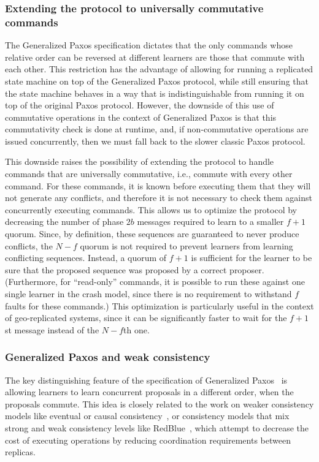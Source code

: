 \subsubsection{Extending the protocol to universally commutative commands}
The Generalized Paxos specification dictates that the only commands whose relative order can be reversed at different learners are those that commute with each other. This restriction has the advantage of allowing for running a replicated state machine on top of the Generalized Paxos protocol, while still ensuring that the state machine behaves in a way that is indistinguishable from running it on top of the original Paxos protocol. However, the downside of this use of commutative operations in the context of Generalized Paxos is that this commutativity check is done at runtime, and, if non-commutative operations are issued
concurrently, then we must fall back to the slower classic Paxos protocol.\par
This downside raises the possibility of extending the protocol to handle commands that are universally commutative, i.e., commute with every
other command. For these commands, it is known before executing them that they will not generate any conflicts, and therefore it is not
necessary to check them against concurrently executing commands. This allows us to optimize the protocol by decreasing the number of phase
$2b$ messages required to learn to a smaller $f+1$ quorum. Since, by definition, these sequences are guaranteed to never produce conflicts,
the $N-f$ quorum is not required to prevent learners from learning conflicting sequences. Instead, a quorum of $f+1$ is sufficient for
the learner to be sure that the proposed sequence was proposed by a correct proposer. (Furthermore, for ``read-only'' commands, it is possible to run these against one single learner in the crash model, since there is no requirement to withstand $f$ faults for these commands.) This optimization is particularly useful in the context of geo-replicated systems, since it can be significantly faster to wait for the $f+1$st message instead of the $N-f$th one.

\subsubsection{Generalized Paxos and weak consistency}
The key distinguishing feature of the specification of Generalized
Paxos~\cite{Lamport2005} is allowing learners to learn concurrent
proposals in a different order, when the proposals commute. This idea
is closely related to the work on weaker consistency models like eventual or
causal consistency~\cite{Ahamad1995}, or consistency models that mix
strong and weak consistency levels like RedBlue~\cite{Li2012}, which attempt
to decrease the cost of executing operations by reducing coordination
requirements between replicas. 


